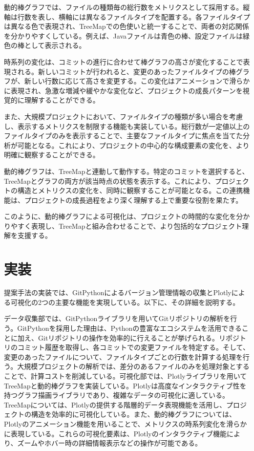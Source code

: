 \documentclass[12pt,twoside]{jbook}
\begin{document}
動的棒グラフでは、ファイルの種類毎の総行数をメトリクスとして採用する。縦軸は行数を表し、横軸には異なるファイルタイプを配置する。各ファイルタイプは異なる色で表現され、TreeMapでの色使いと統一することで、両者の対応関係を分かりやすくしている。例えば、Javaファイルは青色の棒、設定ファイルは緑色の棒として表示される。

時系列の変化は、コミットの進行に合わせて棒グラフの高さが変化することで表現される。新しいコミットが行われると、変更のあったファイルタイプの棒グラフが、新しい行数に応じて高さを変更する。この変化はアニメーションで滑らかに表現され、急激な増減や緩やかな変化など、プロジェクトの成長パターンを視覚的に理解することができる。

また、大規模プロジェクトにおいて、ファイルタイプの種類が多い場合を考慮し、表示するメトリクスを制限する機能も実装している。総行数が一定値以上のファイルタイプのみを表示することで、主要なファイルタイプに焦点を当てた分析が可能となる。これにより、プロジェクトの中心的な構成要素の変化を、より明確に観察することができる。

動的棒グラフは、TreeMapと連動して動作する。特定のコミットを選択すると、TreeMapとグラフの両方が該当時点の状態を表示する。これにより、プロジェクトの構造とメトリクスの変化を、同時に観察することが可能となる。この連携機能は、プロジェクトの成長過程をより深く理解する上で重要な役割を果たす。

このように、動的棒グラフによる可視化は、プロジェクトの時間的な変化を分かりやすく表現し、TreeMapと組み合わせることで、より包括的なプロジェクト理解を支援する。

\section{実装}
提案手法の実装では、GitPythonによるバージョン管理情報の収集とPlotlyによる可視化の2つの主要な機能を実現している。以下に、その詳細を説明する。

データ収集部では、GitPythonライブラリを用いてGitリポジトリの解析を行う。GitPythonを採用した理由は、Pythonの豊富なエコシステムを活用できることに加え、Gitリポジトリの操作を効率的に行えることが挙げられる。リポジトリのコミット履歴を取得し、各コミットでの変更ファイルを特定する。そして、変更のあったファイルについて、ファイルタイプごとの行数を計算する処理を行う。大規模プロジェクトの解析では、差分のあるファイルのみを処理対象とすることで、計算コストを削減している。可視化部では、Plotlyライブラリを用いてTreeMapと動的棒グラフを実装している。Plotlyは高度なインタラクティブ性を持つグラフ描画ライブラリであり、複雑なデータの可視化に適している。TreeMapについては、Plotlyの提供する階層的データ表現機能を活用し、プロジェクトの構造を効率的に可視化している。また、動的棒グラフについては、Plotlyのアニメーション機能を用いることで、メトリクスの時系列変化を滑らかに表現している。これらの可視化要素は、Plotlyのインタラクティブ機能により、ズームやホバー時の詳細情報表示などの操作が可能である。
\end{document}
